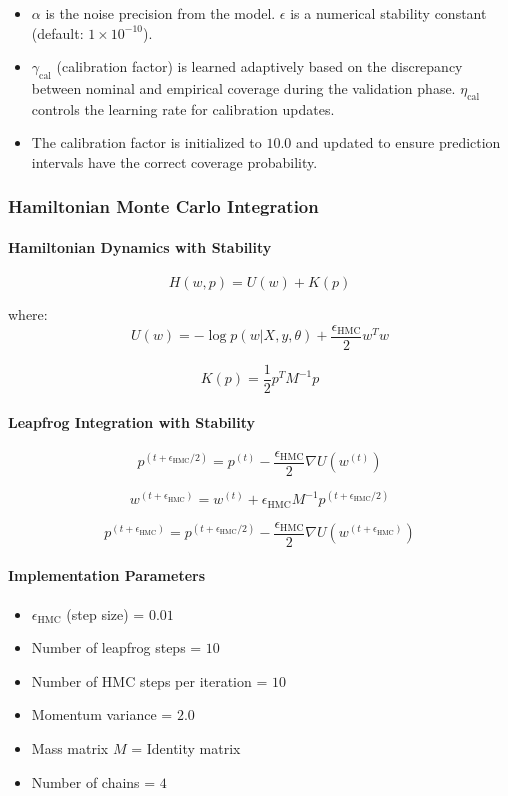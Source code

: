 \begin{itemize}

\item $\alpha$ is the noise precision from the model. $\epsilon$ is a numerical stability constant (default: $1 \times 10^{-10}$).
 
\item $\gamma_{\text{cal}}$ (calibration factor) is learned adaptively based on the discrepancy between nominal and empirical coverage during the validation phase. $\eta_{\text{cal}}$ controls the learning rate for calibration updates.

\item The calibration factor is initialized to $10.0$ and updated to ensure prediction intervals have the correct coverage probability.

\end{itemize}

\subsubsection{Hamiltonian Monte Carlo Integration}

\paragraph{Hamiltonian Dynamics with Stability}
\[
H(w,p) = U(w) + K(p)
\]

where:
\[
U(w) = -\log p(w|X,y,\theta) + \frac{\epsilon_{\text{HMC}}}{2}w^Tw 
\]

\[
K(p) = \frac{1}{2}p^TM^{-1}p 
\]

\paragraph{Leapfrog Integration with Stability}
\[
p^{(t+\epsilon_{\text{HMC}}/2)} = p^{(t)} - \frac{\epsilon_{\text{HMC}}}{2}\nabla U(w^{(t)})
\]

\[
w^{(t+\epsilon_{\text{HMC}})} = w^{(t)} + \epsilon_{\text{HMC}} M^{-1}p^{(t+\epsilon_{\text{HMC}}/2)}
\]

\[
p^{(t+\epsilon_{\text{HMC}})} = p^{(t+\epsilon_{\text{HMC}}/2)} - \frac{\epsilon_{\text{HMC}}}{2}\nabla U(w^{(t+\epsilon_{\text{HMC}})})
\]

\paragraph{Implementation Parameters}
\begin{itemize}
\item $\epsilon_{\text{HMC}}$ (step size) = $0.01$
\item Number of leapfrog steps = $10$
\item Number of HMC steps per iteration = $10$
\item Momentum variance = $2.0$
\item Mass matrix $M$ = Identity matrix
\item Number of chains = $4$
\end{itemize}

